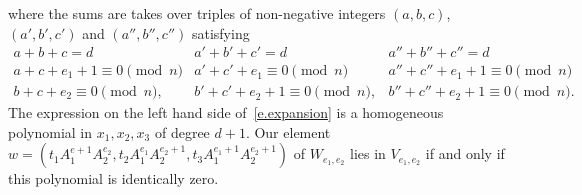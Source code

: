 \documentclass[12pt]{amsart}
\numberwithin{equation}{section}
\numberwithin{subsection}{section}
\theoremstyle{definition} \newtheorem{definition}[theorem]{Definition}
\begin{document}
where the sums are takes over triples of non-negative integers
$(a, b, c)$, $(a', b', c')$ and $(a'', b'', c'')$ satisfying
\[  \begin{array}{l} 
 a + b + c = d \\
 a + c +  e_1 + 1 \equiv 0 \! \! \! \! \! \pmod{n} \\
 b + c + e_2 \equiv 0 \! \! \! \! \! \pmod{n},
 \end{array}  
\begin{array}{l} 
a' + b' + c' = d \\
a' + c' +  e_1 \equiv 0 \! \! \! \! \! \pmod{n} \\
b' + c' + e_2 + 1 \equiv 0 \! \! \! \! \! \pmod{n},
\end{array} 
\begin{array}{l} 
a'' + b'' + c'' = d \\
a'' + c'' +  e_1 + 1 \equiv 0 \! \! \! \! \! \pmod{n} \\
b'' + c'' + e_2 + 1 \equiv 0 \! \! \! \! \! \pmod{n}.
\end{array}  \] 
The expression on the left hand side of~\eqref{e.expansion} is a 
homogeneous polynomial in $x_1, x_2, x_3$ of degree $d + 1$. 
Our element 
$w = (t_1 A_1^{e+1} A_2^{e_2}, t_2 A_1^{e_1} A_2^{e_2 + 1}, 
t_3 A_1^{e_1 + 1} A_2^{e_2 + 1})$ of $W_{e_1, e_2}$ lies 
in $V_{e_1, e_2}$ if and only if this polynomial is identically zero.
\end{document}
